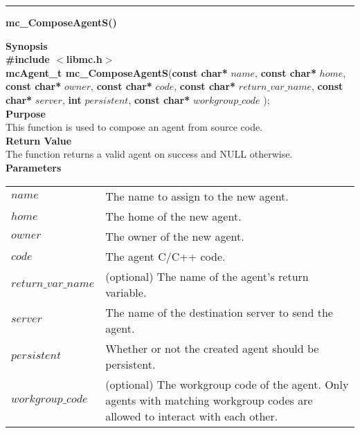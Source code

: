 \noindent
\vspace{5pt}
\rule{6.5in}{0.015in}
\noindent
{}
{\LARGE \bf mc\_ComposeAgentS()}\\

\noindent
{\bf Synopsis}\\
{\bf \#include $<$libmc.h$>$}\\
{\bf mcAgent\_t mc\_ComposeAgentS}({\bf const char*} $name$, 
                                  {\bf const char*} $home$,
                                  {\bf const char*} $owner$,
                                  {\bf const char*} $code$,
                                  {\bf const char*} $return\_var\_name$,
                                  {\bf const char*} $server$,
                                  {\bf int} $persistent$,
                                  {\bf const char*} $workgroup\_code$
																	);\\

\noindent
{\bf Purpose}\\
This function is used to compose an agent from source code.\\

\noindent
{\bf Return Value}\\
The function returns a valid agent on success and NULL otherwise.\\

\noindent
{\bf Parameters}
\vspace{-0.1in}
\begin{description}
\item
\begin{tabular}{p{30 mm}p{125 mm}} 
$name$ & The name to assign to the new agent.\\
$home$ & The home of the new agent.\\
$owner$ & The owner of the new agent.\\
$code$ & The agent C/C++ code.\\
$return\_var\_name$ & (optional) The name of the agent's return variable.\\
$server$ & The name of the destination server to send the agent.\\
$persistent$ & Whether or not the created agent should be persistent.\\
$workgroup\_code$ & (optional) The workgroup code of the agent. Only agents with matching workgroup codes are allowed to interact with each other.\\
\end{tabular}
\end{description}

